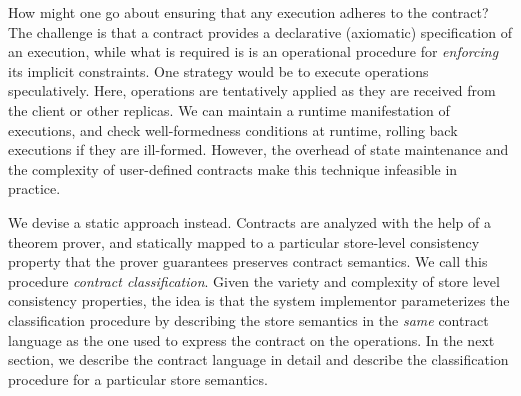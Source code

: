 How might one go about ensuring that any execution adheres to the contract? The
challenge is that a contract provides a declarative (axiomatic) specification
of an execution, while what is required is is an operational procedure for
\emph{enforcing} its implicit constraints. One strategy would be to execute
operations speculatively.  Here, operations are tentatively applied as they are
received from the client or other replicas. We can maintain a runtime
manifestation of executions, and check well-formedness conditions at runtime,
rolling back executions if they are ill-formed. However, the overhead of state
maintenance and the complexity of user-defined contracts make this technique
infeasible in practice.

We devise a static approach instead. Contracts are analyzed with the help of a
theorem prover, and statically mapped to a particular store-level consistency
property that the prover guarantees preserves contract semantics. We call this
procedure \emph{contract classification}. Given the variety and complexity of
store level consistency properties, the idea is that the system implementor
parameterizes the classification procedure by describing the store semantics in
the \emph{same} contract language as the one used to express the contract on
the operations. In the next section, we describe the contract language in
detail and describe the classification procedure for a particular store
semantics.

